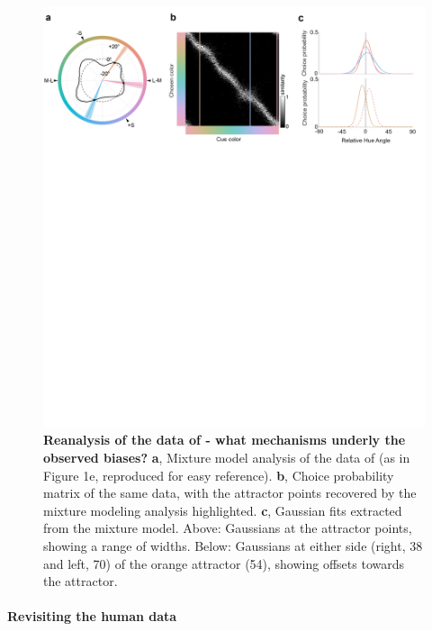 \documentclass[9pt,biorxiv,lineno,onehalfspacing]{lapreprint}
\begin{document}
\begin{refsection}
\begin{figure}
    \begin{fullwidth}
    \centering
    \includegraphics[width=\textwidth+4cm,trim={0 18cm 0 0},clip]{Outputs/Paper/Figures/flat/F5b_HumanMainText_1.png}
    \caption{\textbf {Reanalysis of the data of \citet{bae_why_2015} - what mechanisms underly the observed biases?}
    \textbf{a}, Mixture model analysis of the data of \citet{bae_why_2015} (as in Figure 1e, reproduced for easy reference).
    \textbf{b}, Choice probability matrix of the same data, with the attractor points recovered by the mixture modeling analysis highlighted.
    \textbf{c}, Gaussian fits extracted from the mixture model. 
    Above: Gaussians at the attractor points, showing a range of widths. 
    Below: Gaussians at either side (right, 38\degree{} and left, 70\degree{}) of the orange attractor (54\degree{}), showing offsets towards the attractor.}
    \label{fig:HumanMainText}
    \end{fullwidth}
\end{figure}

\paragraph{Revisiting the human data}


\end{refsection}
\end{document}
